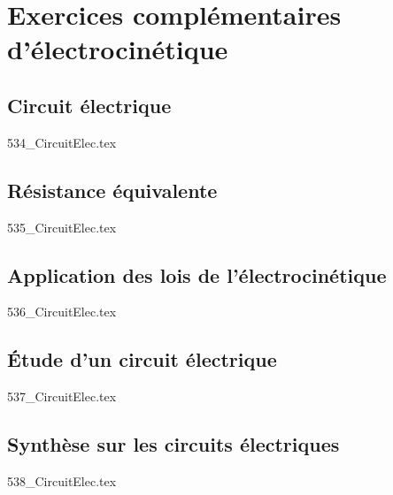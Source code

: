 
\clearpage
\section{Exercices complémentaires d'électrocinétique}


\subsection{Circuit électrique}
\graphicspath{{../TD/534_CircuitElec/images/}{../TD/534_CircuitElec/}{../../Style/png/}}
{534_CircuitElec.tex}

\clearpage
\subsection{Résistance équivalente}
\graphicspath{{../TD/535_CircuitElec/images/}{../TD/535_CircuitElec/}{../../Style/png/}}
{535_CircuitElec.tex}

\clearpage
\subsection{Application des lois de l'électrocinétique}
\graphicspath{{../TD/536_CircuitElec/images/}{../TD/536_CircuitElec/}{../../Style/png/}}
{536_CircuitElec.tex}

\clearpage
\subsection{Étude d'un circuit électrique}
\graphicspath{{../TD/537_CircuitElec/images/}{../TD/537_CircuitElec/}{../../Style/png/}}
{537_CircuitElec.tex}

\clearpage
\subsection{Synthèse sur les circuits électriques}
\graphicspath{{../TD/538_CircuitElec/images/}{../TD/538_CircuitElec/}{../../Style/png/}}
{538_CircuitElec.tex}

